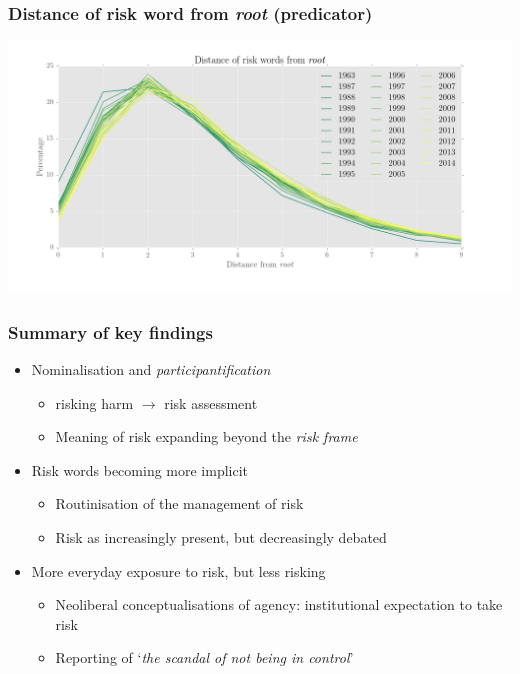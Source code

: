 \documentclass{beamer}       %
\begin{document}
\begin{frame}
    \frametitle{Distance of risk word from \emph{root} (predicator)}
    \centering
    \includegraphics[width=1\textwidth]{../images/distance-of-risk-words-from-root}
\end{frame}



\begin{frame}
    \frametitle{Summary of key findings}
    
    \begin{itemize}
    \item Nominalisation and \emph{participantification}
    \begin{itemize}
        \item risking harm $\rightarrow$ risk assessment
        \item Meaning of risk expanding beyond the \emph{risk frame}
    \end{itemize}
    \item Risk words becoming more implicit
    \begin{itemize}
        \item Routinisation of the management of risk
        \item Risk as increasingly present, but decreasingly debated
    \end{itemize}
    \item More everyday exposure to risk, but less risking
    \begin{itemize}
        \item Neoliberal conceptualisations of agency: institutional expectation to take risk
        \item Reporting of `\emph{the scandal of not being in control}' \cite{beck_risk_1992}
    \end{itemize}
    \end{itemize}
\end{frame}
\end{document}
